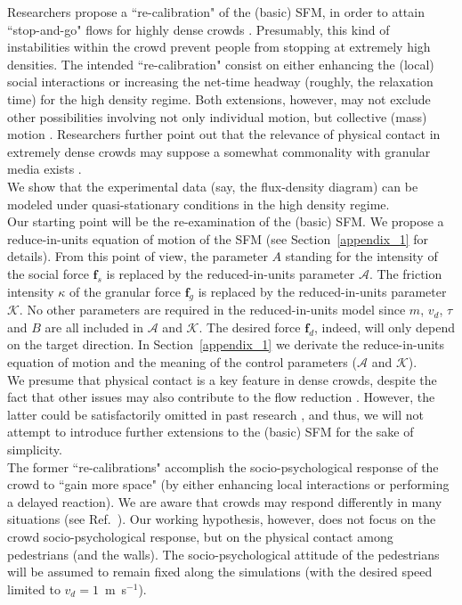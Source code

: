 \documentclass[preprint,12pt]{elsarticle}
\begin{document}
Researchers propose a ``re-calibration" of the (basic) SFM, in order to
attain ``stop-and-go" flows for highly dense crowds
\cite{johansson,yu1}. Presumably, this kind of instabilities within the crowd prevent
people from stopping at extremely high densities. The intended
``re-calibration" consist on either enhancing the (local) social
interactions or increasing the net-time headway (roughly, the
relaxation time) for the high density regime. Both extensions,
however, may not exclude other possibilities involving not only
individual motion, but collective (mass) motion \cite{helbing3}. Researchers
further point out that the relevance of physical contact in extremely
dense crowds may suppose a somewhat commonality with granular
media exists \cite{helbing3}.\\

We show that the experimental data (say, the flux-density diagram) can be 
modeled under quasi-stationary conditions in the high density regime.\\

Our starting point will be the re-examination of the (basic) SFM. 
We propose a reduce-in-units equation of motion of the SFM (see Section~\ref{appendix_1} 
for details). From this point of view, the parameter $A$ standing for the intensity of the
 social force $\mathbf{f}_s$ is replaced by the reduced-in-units parameter $\mathcal{A}$.
 The friction intensity $\kappa$ of the granular force $\mathbf{f}_g$ is replaced by the reduced-in-units
 parameter $\mathcal{K}$. No other parameters are required in the reduced-in-units model
 since $m$, $v_d$, $\tau$ and $B$ are all included in $\mathcal{A}$ and $\mathcal{K}$.
 The desired force $\mathbf{f}_d$, indeed, will only depend on the target direction. In Section~\ref{appendix_1} we derivate the 
reduce-in-units equation of motion and the meaning of the control parameters ($\mathcal{A}$ and $\mathcal{K}$). \\

 We presume that physical contact is
a key feature in dense crowds, despite the fact that other issues may
also contribute to the flow reduction \cite{johansson1}. However, the latter could
be satisfactorily omitted in past research \cite{johansson}, and thus, we will not
attempt to introduce further extensions to the (basic) SFM for the
sake of simplicity.\\

The former ``re-calibrations" accomplish the socio-psychological
response of the crowd to ``gain more space" (by either enhancing local
interactions or performing a delayed reaction). We are aware that
crowds may respond differently in many situations (see Ref.~\cite{drury1}). Our working
hypothesis, however, does not focus on the crowd socio-psychological
response, but on the physical contact among pedestrians (and the
walls). The socio-psychological attitude of the pedestrians will be
assumed to remain fixed along the simulations (with the 
desired speed limited to $v_d=1\,$ m~s$^{-1}$). \\
\end{document}
